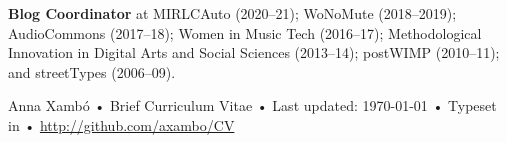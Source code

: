 \documentclass[10pt, a4paper]{article}
\begin{document}
{\textbf{Blog Coordinator}} at MIRLCAuto (2020--21); WoNoMute (2018--2019); AudioCommons (2017--18); Women in Music Tech (2016--17); Methodological Innovation in Digital Arts and Social Sciences (2013--14); postWIMP (2010--11); and streetTypes (2006--09).


\begin{center}
{\scriptsize  Anna Xambó •\- Brief Curriculum Vitae •\- Last updated: \today\- •\- %
Typeset in \href{http://nitens.org/taraborelli/cvtex}{
\XeTeX } %
•\- 
\href{http://github.com/axambo/CV}{http://github.com/axambo/CV}}
\end{center}
\end{document}
